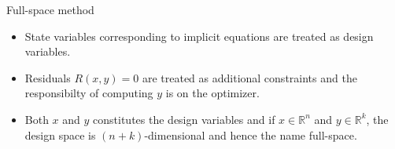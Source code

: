 \documentclass{beamer}
\begin{document}
  \begin{frame}{Full-space method}
    \vspace{-10mm}
    \begin{itemize}
      \item State variables corresponding to implicit equations are treated as design variables.
      \item Residuals $R(x,y) = 0$ are treated as additional constraints and the responsibilty of computing $y$ is on the optimizer.
      \item Both $x$ and $y$ constitutes the design variables and if $x \in \mathbb{R}^n$ and $y \in \mathbb{R}^k$, the design space is $(n + k)$-dimensional and hence the name full-space.
    \end{itemize}
  \end{frame}
\end{document}
